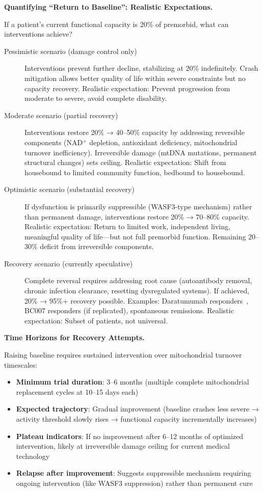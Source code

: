\textbf{Quantifying ``Return to Baseline'': Realistic Expectations.}

If a patient's current functional capacity is 20\% of premorbid, what can interventions achieve?

\begin{description}
    \item[Pessimistic scenario (damage control only)] Interventions prevent further decline, stabilizing at 20\% indefinitely. Crash mitigation allows better quality of life within severe constraints but no capacity recovery. Realistic expectation: Prevent progression from moderate to severe, avoid complete disability.

    \item[Moderate scenario (partial recovery)] Interventions restore 20\% → 40--50\% capacity by addressing reversible components (NAD$^+$ depletion, antioxidant deficiency, mitochondrial turnover inefficiency). Irreversible damage (mtDNA mutations, permanent structural changes) sets ceiling. Realistic expectation: Shift from housebound to limited community function, bedbound to housebound.

    \item[Optimistic scenario (substantial recovery)] If dysfunction is primarily suppressible (WASF3-type mechanism) rather than permanent damage, interventions restore 20\% → 70--80\% capacity. Realistic expectation: Return to limited work, independent living, meaningful quality of life---but not full premorbid function. Remaining 20--30\% deficit from irreversible components.

    \item[Recovery scenario (currently speculative)] Complete reversal requires addressing root cause (autoantibody removal, chronic infection clearance, resetting dysregulated systems). If achieved, 20\% → 95\%+ recovery possible. Examples: Daratumumab responders~\cite{scheibenbogen2024daratumumab}, BC007 responders (if replicated), spontaneous remissions. Realistic expectation: Subset of patients, not universal.
\end{description}

\textbf{Time Horizons for Recovery Attempts.}

Raising baseline requires sustained intervention over mitochondrial turnover timescales:

\begin{itemize}
    \item \textbf{Minimum trial duration}: 3--6 months (multiple complete mitochondrial replacement cycles at 10--15 days each)
    \item \textbf{Expected trajectory}: Gradual improvement (baseline crashes less severe → activity threshold slowly rises → functional capacity incrementally increases)
    \item \textbf{Plateau indicators}: If no improvement after 6--12 months of optimized intervention, likely at irreversible damage ceiling for current medical technology
    \item \textbf{Relapse after improvement}: Suggests suppressible mechanism requiring ongoing intervention (like WASF3 suppression) rather than permanent cure
\end{itemize}

